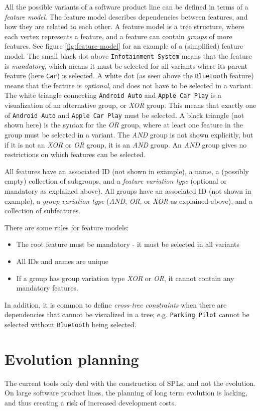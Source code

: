 \documentclass[a4paper,english]{ifimaster}
\begin{document}
All the possible variants of a software product line can be defined in terms of a \emph{feature model}. The feature model describes dependencies between features, and how they are related to each other. A feature model is a tree structure, where each vertex represents a feature, and a feature can contain \emph{groups} of more features. See figure \vref{fig:feature-model} for an example of a (simplified) feature model. The small black dot above \texttt{Infotainment System} means that the feature is \emph{mandatory}, which means it must be selected for all variants where its parent feature (here \texttt{Car}) is selected. A white dot (as seen above the \texttt{Bluetooth} feature) means that the feature is \emph{optional}, and does not have to be selected in a variant. The white triangle connecting \texttt{Android Auto} and \texttt{Apple Car Play} is a visualization of an alternative group, or \textit{XOR} group. This means that exactly one of \texttt{Android Auto} and \texttt{Apple Car Play} must be selected. A black triangle (not shown here) is the syntax for the \textit{OR} group, where at least one feature in the group must be selected in a variant. The \textit{AND} group is not shown explicitly, but if it is not an \textit{XOR} or \textit{OR} group, it is an \textit{AND} group. An \textit{AND} group gives no restrictions on which features can be selected.

All features have an associated ID (not shown in example), a name, a (possibly empty) collection of subgroups, and a \emph{feature variation type} (optional or mandatory as explained above). All groups have an associated ID (not shown in example), a \textit{group variation type} (\textit{AND}, \textit{OR}, or \textit{XOR} as explained above), and a collection of subfeatures.

There are some rules for feature models: 
\begin{itemize}
  \item The root feature must be mandatory - it must be selected in all variants
  \item All IDs and names are unique
  \item If a group has group variation type \textit{XOR} or \textit{OR}, it cannot contain any mandatory features.
\end{itemize}
In addition, it is common to define \emph{cross-tree constraints} when there are dependencies that cannot be visualized in a tree; e.g. \texttt{Parking Pilot} cannot be selected without \texttt{Bluetooth} being selected.
\section{Evolution planning}
\label{sec:evolution-planning}
The current tools only deal with the construction of SPLs, and not the evolution. On large software product lines, the planning of long term evolution is lacking, and thus creating a risk of increased development costs. 
\end{document}
